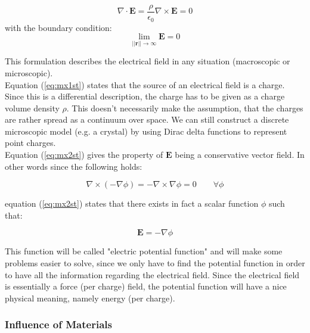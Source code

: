 \begin{subequations}
\begin{equation}\label{eq:mx1st}
\nabla \cdot \textbf{E} = \frac{\rho}{\epsilon_0}
\end{equation}
\begin{equation}\label{eq:mx2st}
\nabla \times \textbf{E} = 0
\end{equation}
\end{subequations}
with the boundary condition:
\begin{equation}\label{eq:mx12stbc}
\lim_{||\textbf{r}||  \rightarrow \infty} \textbf{E} =0
\end{equation}

This formulation describes the electrical field in any situation (macroscopic or microscopic).\\

Equation (\ref{eq:mx1st}) states that the source of an electrical field is a charge. Since this is a differential description, the charge has to be given as a charge volume density $\rho$. This doesn't necessarily make the assumption, that the charges are rather spread as a continuum over space. We can still construct a discrete microscopic model (e.g. a crystal) by using Dirac delta functions to represent point charges.\\

Equation (\ref{eq:mx2st}) gives the property of $\textbf{E}$ being a conservative vector field. In other words since the following holds:

\begin{equation}
\nabla\times(-\nabla\phi) = -\nabla\times\nabla\phi =0 \qquad \forall \phi
\end{equation}

equation (\ref{eq:mx2st}) states that there exists in fact a scalar function $\phi$ such that:

\begin{equation}
\textbf{E} = -\nabla\phi
\end{equation}

This function will be called "electric potential function"  and will make some problems easier to solve, since we only have to find the potential function in order to have all the information regarding the electrical field. Since the electrical field is essentially a force (per charge) field, the potential function will have a nice physical meaning, namely energy (per charge).

\subsubsection{Influence of Materials}

